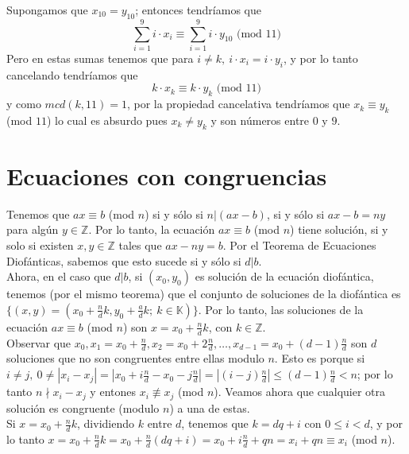 \documentclass{report}
\begin{document}
\begin{myproof}
    Supongamos que $x_{10}=y_{10}$; entonces tendríamos que $$\sum_{i=1}^{9} i\cdot x_i\equiv\sum_{i=1}^{9} i\cdot y_{10}\text{ (mod $11$)}$$
    Pero en estas sumas tenemos que para $i\neq k,\ i\cdot x_i=i\cdot y_i$, y por lo tanto cancelando tendríamos que $$k\cdot x_k\equiv k\cdot y_k\text{ (mod $11$)}$$y como $mcd(k,11)=1$, por la propiedad cancelativa tendríamos que $x_k\equiv y_k$ (mod $11$) lo cual es absurdo pues $x_k\neq y_k$ y son números entre $0$ y $9$. 
\end{myproof}
\newpage\section{Ecuaciones con congruencias}
\begin{myproof}
    Tenemos que $ax\equiv b$ (mod $n$) si y sólo si $n|(ax-b)$, si y sólo si $ax-b=ny$ para algún $y\in\mathbb{Z}$. Por lo tanto, la ecuación $ax\equiv b$ (mod $n$) tiene solución, si y solo si existen $x,y\in\mathbb{Z}$ tales que $ax-ny=b$. Por el Teorema de Ecuaciones Diofánticas, sabemos que esto sucede si y sólo si $d|b$.\\
    Ahora, en el caso que $d|b$, si $(x_0,y_0)$ es solución de la ecuación diofántica, tenemos (por el mismo teorema) que el conjunto de soluciones de la diofántica es $\{\left( x,y \right)=\left( x_0+\frac{n}{d}k,y_0+\frac{a}{d}k;\ k\in\mathbb{K} \right)\}$. Por lo tanto, las soluciones de la ecuación $ax\equiv b$ (mod $n$) son $x=x_0+\frac{n}{d}k$, con $k\in\mathbb{Z}$.\\
    Observar que $x_0,x_1=x_0+\frac{n}{d},x_2=x_0+2\frac{n}{d},\dots,x_{d-1}=x_0+(d-1)\frac{n}{d}$ son $d$ soluciones que no son congruentes entre ellas modulo $n$. Esto es porque si $i\neq j,\ 0\neq |x_i-x_j|=|x_0+i\frac{n}{d}-x_0-j\frac{n}{d}|=|(i-j)\frac{n}{d}|\le (d-1)\frac{n}{d}<n$; por lo tanto $n\nmid x_i-x_j$ y entones $x_i\nequiv x_j$ (mod $n$). Veamos ahora que cualquier otra solución es congruente (modulo $n$) a una de estas.\\
    Si $x=x_0+\frac{n}{d}k$, dividiendo $k$ entre $d$, tenemos que $k=dq+i$ con $0\le i<d$, y por lo tanto $x=x_0+\frac{n}{d}k=x_0+\frac{n}{d}(dq+i)=x_0+i\frac{n}{d}+qn=x_i+qn\equiv x_i$ (mod $n$).
\end{myproof}
\end{document}
